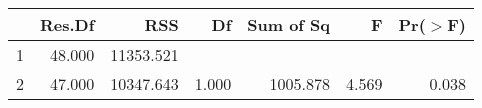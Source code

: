\begin{table}[ht]
\centering
\begin{tabular}{lrrrrrr}
  \hline
 & Res.Df & RSS & Df & Sum of Sq & F & Pr($>$F) \\ 
  \hline
1 & 48.000 & 11353.521 &  &  &  &  \\ 
  2 & 47.000 & 10347.643 & 1.000 & 1005.878 & 4.569 & 0.038 \\ 
   \hline
\end{tabular}
\end{table}
